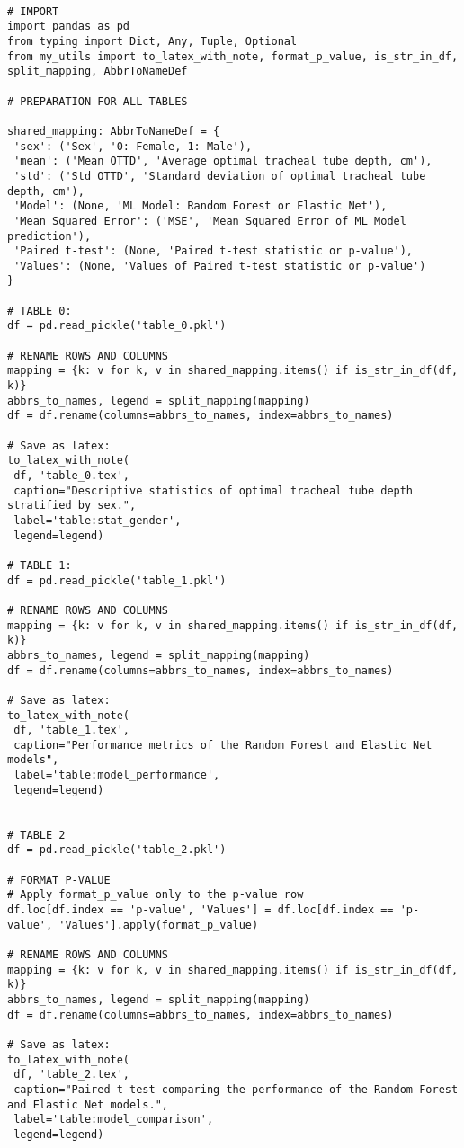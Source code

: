 \documentclass[11pt]{article}
\begin{document}
\begin{verbatim}

# IMPORT
import pandas as pd
from typing import Dict, Any, Tuple, Optional
from my_utils import to_latex_with_note, format_p_value, is_str_in_df, split_mapping, AbbrToNameDef

# PREPARATION FOR ALL TABLES

shared_mapping: AbbrToNameDef = {
 'sex': ('Sex', '0: Female, 1: Male'),
 'mean': ('Mean OTTD', 'Average optimal tracheal tube depth, cm'),
 'std': ('Std OTTD', 'Standard deviation of optimal tracheal tube depth, cm'),
 'Model': (None, 'ML Model: Random Forest or Elastic Net'),
 'Mean Squared Error': ('MSE', 'Mean Squared Error of ML Model prediction'),
 'Paired t-test': (None, 'Paired t-test statistic or p-value'),
 'Values': (None, 'Values of Paired t-test statistic or p-value')
}

# TABLE 0:
df = pd.read_pickle('table_0.pkl')

# RENAME ROWS AND COLUMNS 
mapping = {k: v for k, v in shared_mapping.items() if is_str_in_df(df, k)} 
abbrs_to_names, legend = split_mapping(mapping)
df = df.rename(columns=abbrs_to_names, index=abbrs_to_names)

# Save as latex:
to_latex_with_note(
 df, 'table_0.tex',
 caption="Descriptive statistics of optimal tracheal tube depth stratified by sex.", 
 label='table:stat_gender',
 legend=legend)

# TABLE 1:
df = pd.read_pickle('table_1.pkl')

# RENAME ROWS AND COLUMNS 
mapping = {k: v for k, v in shared_mapping.items() if is_str_in_df(df, k)} 
abbrs_to_names, legend = split_mapping(mapping)
df = df.rename(columns=abbrs_to_names, index=abbrs_to_names)

# Save as latex:
to_latex_with_note(
 df, 'table_1.tex',
 caption="Performance metrics of the Random Forest and Elastic Net models", 
 label='table:model_performance',
 legend=legend)


# TABLE 2
df = pd.read_pickle('table_2.pkl')

# FORMAT P-VALUE
# Apply format_p_value only to the p-value row 
df.loc[df.index == 'p-value', 'Values'] = df.loc[df.index == 'p-value', 'Values'].apply(format_p_value)

# RENAME ROWS AND COLUMNS 
mapping = {k: v for k, v in shared_mapping.items() if is_str_in_df(df, k)} 
abbrs_to_names, legend = split_mapping(mapping)
df = df.rename(columns=abbrs_to_names, index=abbrs_to_names)

# Save as latex:
to_latex_with_note(
 df, 'table_2.tex',
 caption="Paired t-test comparing the performance of the Random Forest and Elastic Net models.", 
 label='table:model_comparison',
 legend=legend)



\end{verbatim}
\end{document}
